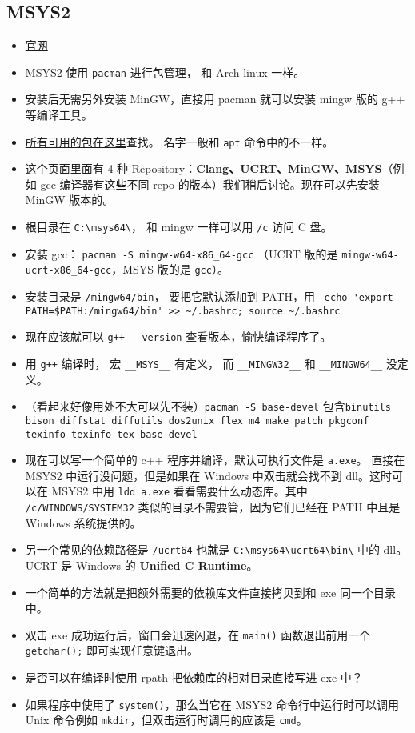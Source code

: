 \subsection{MSYS2}
\begin{itemize}
\item \href{https://www.msys2.org/}{官网}
\item MSYS2 使用 \verb`pacman` 进行包管理， 和 Arch linux 一样。
\item 安装后无需另外安装 MinGW，直接用 pacman 就可以安装 mingw 版的 g++ 等编译工具。
\item \href{https://packages.msys2.org/queue}{所有可用的包在这里}查找。 名字一般和 \verb|apt| 命令中的不一样。
\item 这个页面里面有 4 种 Repository：\textbf{Clang、UCRT、MinGW、MSYS}（例如 gcc 编译器有这些不同 repo 的版本）我们稍后讨论。现在可以先安装 MinGW 版本的。
\item 根目录在 \verb|C:\msys64\|， 和 mingw 一样可以用 \verb|/c| 访问 C 盘。
\item 安装 gcc： \verb`pacman -S mingw-w64-x86_64-gcc` （UCRT 版的是 \verb`mingw-w64-ucrt-x86_64-gcc`，MSYS 版的是 \verb`gcc`）。
\item 安装目录是 \verb`/mingw64/bin`， 要把它默认添加到 PATH，用 \verb` echo 'export PATH=$PATH:/mingw64/bin' >> ~/.bashrc; source ~/.bashrc`
\item 现在应该就可以 \verb`g++ --version` 查看版本，愉快编译程序了。
\item 用 \verb|g++| 编译时， 宏 \verb|__MSYS__| 有定义， 而 \verb|__MINGW32__| 和 \verb|__MINGW64__| 没定义。
\item （看起来好像用处不大可以先不装）\verb|pacman -S base-devel| 包含\verb`binutils bison diffstat diffutils dos2unix flex m4 make patch pkgconf texinfo texinfo-tex base-devel`
\item 现在可以写一个简单的 c++ 程序并编译，默认可执行文件是 \verb`a.exe`。 直接在 MSYS2 中运行没问题，但是如果在 Windows 中双击就会找不到 dll。这时可以在 MSYS2 中用 \verb`ldd a.exe` 看看需要什么动态库。其中 \verb`/c/WINDOWS/SYSTEM32` 类似的目录不需要管，因为它们已经在 PATH 中且是 Windows 系统提供的。
\item 另一个常见的依赖路径是 \verb`/ucrt64` 也就是 \verb`C:\msys64\ucrt64\bin\` 中的 dll。 UCRT 是 Windows 的 \textbf{Unified C Runtime}。
\item 一个简单的方法就是把额外需要的依赖库文件直接拷贝到和 exe 同一个目录中。
\item 双击 exe 成功运行后，窗口会迅速闪退，在 \verb`main()` 函数退出前用一个 \verb`getchar();` 即可实现任意键退出。
\item 是否可以在编译时使用 rpath 把依赖库的相对目录直接写进 exe 中？
\item 如果程序中使用了 \verb`system()`，那么当它在 MSYS2 命令行中运行时可以调用 Unix 命令例如 \verb`mkdir`，但双击运行时调用的应该是 \verb`cmd`。
\end{itemize}

